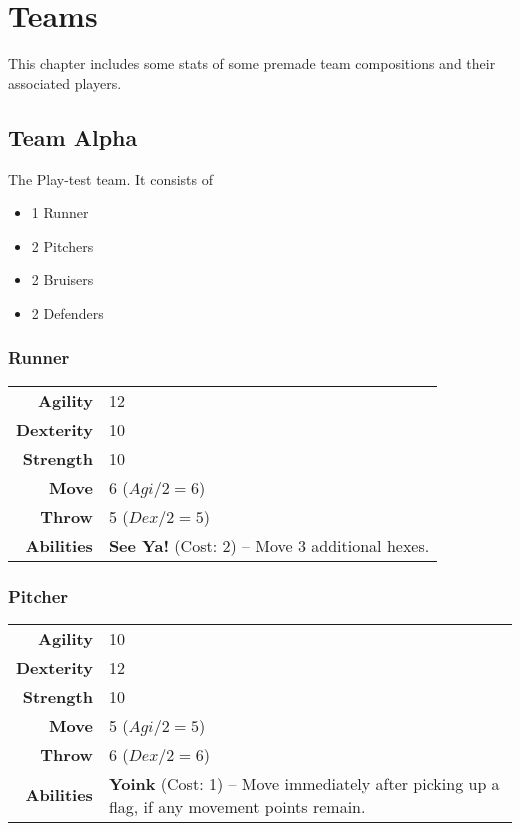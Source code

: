 \chapter{Teams}
This chapter includes some stats of some premade team compositions and their associated players.
\section{Team Alpha}
The Play-test team.
It consists of
\begin{itemize}
    \item 1 Runner
    \item 2 Pitchers
    \item 2 Bruisers
    \item 2 Defenders
\end{itemize}

\subsection{Runner}
\begin{center}
\begin{tabular}{r|p{5cm}}
    \textbf{Agility} & 12 \\
    \textbf{Dexterity} & 10 \\
    \textbf{Strength} & 10 \\ \hline
    \textbf{Move} & 6 ($Agi/2=6$)\\
    \textbf{Throw} & 5 ($Dex/2=5$) \\ \hline
    \textbf{Abilities} & \textbf{See Ya!} (Cost: 2) -- Move 3 additional hexes.
\end{tabular}
\end{center}

\subsection{Pitcher}
\begin{center}
\begin{tabular}{r|p{5cm}}
    \textbf{Agility} & 10 \\
    \textbf{Dexterity} & 12 \\
    \textbf{Strength} & 10 \\ \hline
    \textbf{Move} & 5 ($Agi/2=5$)\\
    \textbf{Throw} & 6 ($Dex/2=6$) \\ \hline
    \textbf{Abilities} & \textbf{Yoink} (Cost: 1) -- Move immediately after picking up a flag, if any movement points remain.
\end{tabular}
\end{center}

